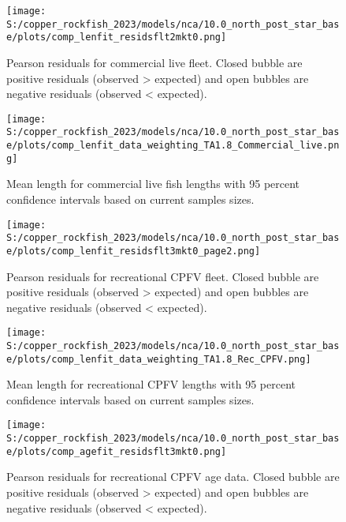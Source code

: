 \documentclass[11pt,
  letterpaper,
]{article}
\begin{document}
\pagebreak

\begin{figure}
{\centering
\texttt{[image: S:/copper\_rockfish\_2023/models/nca/10.0\_north\_post\_star\_base/plots/comp\_lenfit\_residsflt2mkt0.png]}
}
\caption{Pearson residuals for commercial live fleet. Closed bubble are positive residuals (observed > expected) and open bubbles are negative residuals (observed < expected).\label{fig:com-live-pearson}}
\end{figure}

\pagebreak

\begin{figure}
{\centering
\texttt{[image: S:/copper\_rockfish\_2023/models/nca/10.0\_north\_post\_star\_base/plots/comp\_lenfit\_data\_weighting\_TA1.8\_Commercial\_live.png]}
}
\caption{Mean length for commercial live fish lengths with 95 percent confidence intervals based on current samples sizes.\label{fig:com-live-mean-len-fit}}
\end{figure}

\pagebreak

\begin{figure}
{\centering
\texttt{[image: S:/copper\_rockfish\_2023/models/nca/10.0\_north\_post\_star\_base/plots/comp\_lenfit\_residsflt3mkt0\_page2.png]}
}
\caption{Pearson residuals for recreational CPFV fleet. Closed bubble are positive residuals (observed > expected) and open bubbles are negative residuals (observed < expected).\label{fig:rec-cpfv-pearson}}
\end{figure}

\pagebreak

\begin{figure}
{\centering
\texttt{[image: S:/copper\_rockfish\_2023/models/nca/10.0\_north\_post\_star\_base/plots/comp\_lenfit\_data\_weighting\_TA1.8\_Rec\_CPFV.png]}
}
\caption{Mean length for recreational CPFV lengths with 95 percent confidence intervals based on current samples sizes.\label{fig:rec-cpfv-mean-len-fit}}
\end{figure}

\pagebreak

\begin{figure}
{\centering
\texttt{[image: S:/copper\_rockfish\_2023/models/nca/10.0\_north\_post\_star\_base/plots/comp\_agefit\_residsflt3mkt0.png]}
}
\caption{Pearson residuals for recreational CPFV age data. Closed bubble are positive residuals (observed > expected) and open bubbles are negative residuals (observed < expected).\label{fig:rec-cpfv-age-pearson}}
\end{figure}
\end{document}
